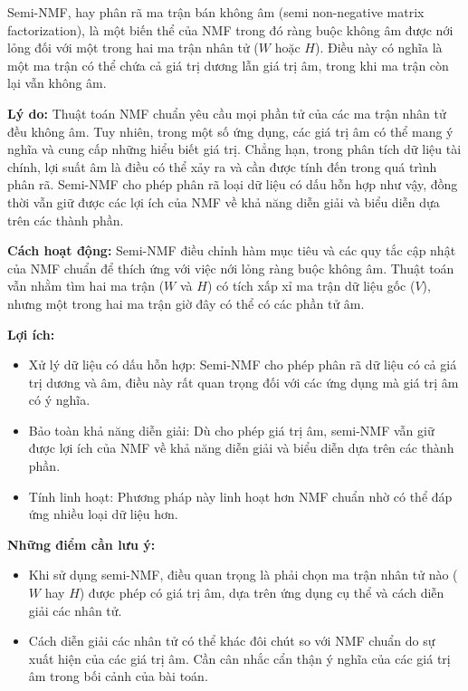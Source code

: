Semi-NMF, hay phân rã ma trận bán không âm (semi non-negative matrix factorization), là một biến thể của NMF trong đó ràng buộc không âm được nới lỏng đối với một trong hai ma trận nhân tử (\(W\) hoặc \(H\)). Điều này có nghĩa là một ma trận có thể chứa cả giá trị dương lẫn giá trị âm, trong khi ma trận còn lại vẫn không âm.

\textbf{Lý do:} Thuật toán NMF chuẩn yêu cầu mọi phần tử của các ma trận nhân tử đều không âm. Tuy nhiên, trong một số ứng dụng, các giá trị âm có thể mang ý nghĩa và cung cấp những hiểu biết giá trị. Chẳng hạn, trong phân tích dữ liệu tài chính, lợi suất âm là điều có thể xảy ra và cần được tính đến trong quá trình phân rã. Semi-NMF cho phép phân rã loại dữ liệu có dấu hỗn hợp như vậy, đồng thời vẫn giữ được các lợi ích của NMF về khả năng diễn giải và biểu diễn dựa trên các thành phần.

\textbf{Cách hoạt động:} Semi-NMF điều chỉnh hàm mục tiêu và các quy tắc cập nhật của NMF chuẩn để thích ứng với việc nới lỏng ràng buộc không âm. Thuật toán vẫn nhằm tìm hai ma trận (\(W\) và \(H\)) có tích xấp xỉ ma trận dữ liệu gốc (\(V\)), nhưng một trong hai ma trận giờ đây có thể có các phần tử âm.

\textbf{Lợi ích:}

\begin{itemize}
\item
  Xử lý dữ liệu có dấu hỗn hợp: Semi-NMF cho phép phân rã dữ liệu có cả giá trị dương và âm, điều này rất quan trọng đối với các ứng dụng mà giá trị âm có ý nghĩa.
\item
  Bảo toàn khả năng diễn giải: Dù cho phép giá trị âm, semi-NMF vẫn giữ được lợi ích của NMF về khả năng diễn giải và biểu diễn dựa trên các thành phần.
\item
  Tính linh hoạt: Phương pháp này linh hoạt hơn NMF chuẩn nhờ có thể đáp ứng nhiều loại dữ liệu hơn.
\end{itemize}

\textbf{Những điểm cần lưu ý:}

\begin{itemize}
\item
  Khi sử dụng semi-NMF, điều quan trọng là phải chọn ma trận nhân tử nào (\(W\) hay \(H\)) được phép có giá trị âm, dựa trên ứng dụng cụ thể và cách diễn giải các nhân tử.
\item
  Cách diễn giải các nhân tử có thể khác đôi chút so với NMF chuẩn do sự xuất hiện của các giá trị âm. Cần cân nhắc cẩn thận ý nghĩa của các giá trị âm trong bối cảnh của bài toán.
\end{itemize}

